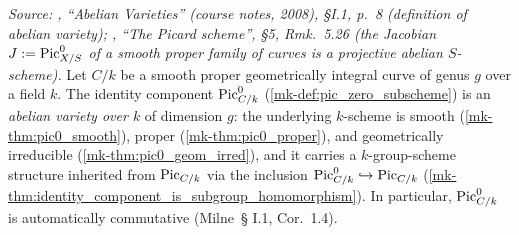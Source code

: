 \begin{theorem}\label{mk-thm:pic0_isAbelianVariety}
  \leanok

  \textit{Source: \cite{milne-av}, ``Abelian Varieties'' (course notes, 2008),
  \S I.1, p.~8 (definition of abelian variety); \cite{kleiman-picard}, ``The
  Picard scheme'', \S 5, Rmk.~5.26 (the Jacobian
  \(J := \operatorname{Pic}^0_{X/S}\) of a smooth proper family of curves is a
  projective abelian \(S\)-scheme).}
  Let \(C/k\) be a smooth proper geometrically integral curve of
  genus \(g\) over a field \(k\). The identity component
  \(\operatorname{Pic}^0_{C/k}\) (\ref{mk-def:pic_zero_subscheme}) is an
  \emph{abelian variety over \(k\)} of dimension \(g\): the underlying
  \(k\)-scheme is smooth (\ref{mk-thm:pic0_smooth}), proper
  (\ref{mk-thm:pic0_proper}), and geometrically irreducible
  (\ref{mk-thm:pic0_geom_irred}), and it carries a \(k\)-group-scheme
  structure inherited from \(\operatorname{Pic}_{C/k}\) via the inclusion
  \(\operatorname{Pic}^0_{C/k} \hookrightarrow \operatorname{Pic}_{C/k}\)
  (\ref{mk-thm:identity_component_is_subgroup_homomorphism}). In
  particular, \(\operatorname{Pic}^0_{C/k}\) is automatically commutative (Milne~\S
  I.1, Cor.~1.4).
\end{theorem}

